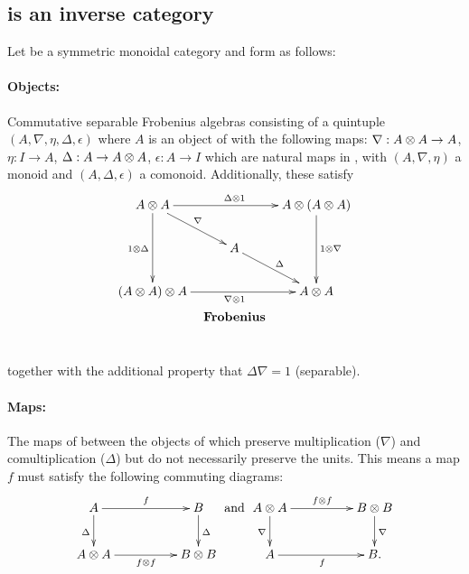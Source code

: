 \subsection{\CFrob is an inverse category}\label{ssec:cfrob_x_is_an_inverse_category}
\begin{example}\label{example:commfrob}
  Let \X be a symmetric monoidal category and form \CFrob as follows: \paragraph{\textbf{Objects:}}
  Commutative separable Frobenius algebras consisting of a quintuple
  $(A,\nabla,\eta,\Delta,\epsilon)$ where $A$ is an object of \X with the following maps:
  $\nabla :A\otimes A \to A$, $\eta:I\to A$, $\Delta : A \to A\otimes A$, $\epsilon : A \to I$ which are natural
  maps in \X, with $(A,\nabla,\eta)$ a monoid and $(A,\Delta,\epsilon)$ a comonoid. Additionally,
  these satisfy
  \[
    \xymatrix @C=10pt @R=20pt{
      A \* A \ar[dd]_{1\*\Delta} \ar[dr]^{\nabla}
        \ar[rr]^{\Delta \* 1} & &
        A \* (A \* A) \ar[dd]^{1 \* \nabla}\\
      & A \ar[dr]^{\Delta} & \\
      (A \* A) \* A \ar[rr]_{\nabla \* 1} & &
        A \* A\\
      &*!<0pt,-25pt>{\text{\textbf{Frobenius}}}
    }
  \]
  together with the additional property that $\Delta \nabla = 1$ (separable).

  \paragraph{\textbf{Maps:}} The maps of \X between the objects of \X which preserve multiplication ($\nabla$)
  and comultiplication ($\Delta$) but do not necessarily preserve the units.
  This means a map $f$ must satisfy the following commuting diagrams:
  \[
    \xymatrix@C+25pt{
      A \ar[d]_{\Delta} \ar[r]^{f} & B \ar[d]^{\Delta}\\
      A\*A \ar[r]_{f\*f} & B\* B
    }
    \text{ and }
    \xymatrix@C+25pt{
      A\*A \ar[d]_{\nabla} \ar[r]^{f\*f}& B\*B \ar[d]^{\nabla}\\
      A \ar[r]_{f} & B.
    }
  \]
\end{example}


